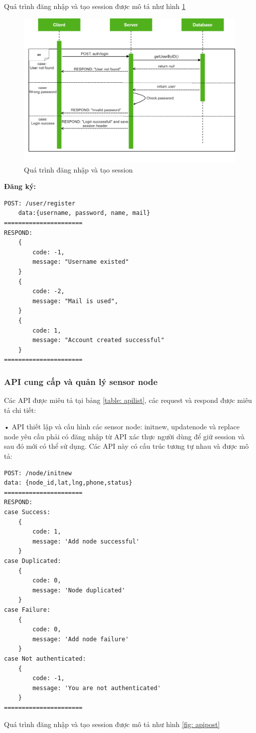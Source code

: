 Quá trình đăng nhập và tạo session được mô tả như hình \ref{fig: apilogin}

\begin{figure}[H]
	\centering    
	\includegraphics[width=1\textwidth]{apilogin}
	\caption[Quá trình đăng nhập và tạo session]{Quá trình đăng nhập và tạo session}
	\label{fig: apilogin}
\end{figure}


\textbf{Đăng ký:}

\begin{Verbatim}[xleftmargin=2em]
POST: /user/register
	data:{username, password, name, mail}
======================	
RESPOND:
	{
		code: -1,
		message: "Username existed"
	}
	{
		code: -2,
		message: "Mail is used",
	}
	{
		code: 1,
		message: "Account created successful"
	}
======================	
\end{Verbatim}
\subsubsection*{API cung cấp và quản lý sensor node}
Các API được miêu tả tại bảng \ref{table: apilist}, các request và respond được miêu tả chi tiết:

• API thiết lập và cấu hình các sensor node: initnew, updatenode và replace node yêu cầu phải có đăng nhập từ API xác thực người dùng để giữ session và sau đó mới có thể sử dụng. Các API này có cấu trúc tương tự nhau và được mô tả:
\begin{Verbatim}[xleftmargin=2em]
POST: /node/initnew
data: {node_id,lat,lng,phone,status}
======================
RESPOND:
case Success:
	{
		code: 1,
		message: 'Add node successful'
	}
case Duplicated:
	{
		code: 0,
		message: 'Node duplicated'
	}
case Failure:
	{
		code: 0,
		message: 'Add node failure'
	}
case Not authenticated:
	{
		code: -1,
		message: 'You are not authenticated'
	}
======================	

\end{Verbatim}
Quá trình đăng nhập và tạo session được mô tả như hình \ref{fig: apipost}

